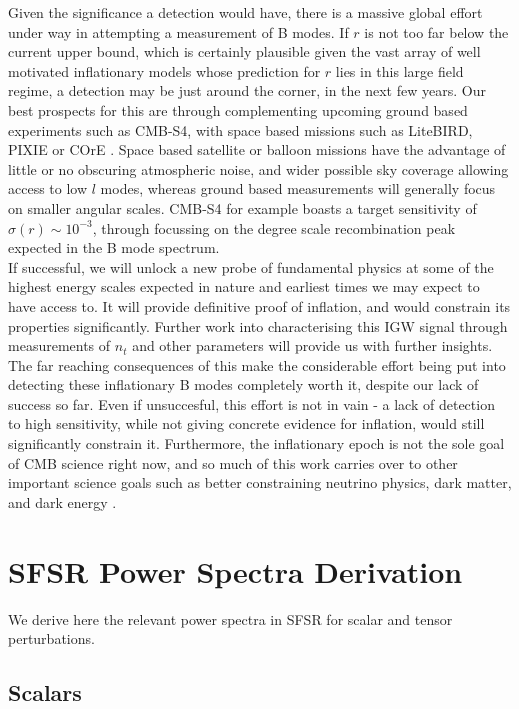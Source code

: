 \documentclass[a4paper,10pt]{article}
\begin{document}
Given the significance a detection would have, there is a massive global effort under way in attempting a measurement of B modes. If $r$ is not too far below the current upper bound, which is certainly plausible given the vast array of well motivated inflationary models whose prediction for $r$ lies in this large field regime, a detection may be just around the corner, in the next few years. Our best prospects for this are through complementing upcoming ground based experiments such as CMB-S4, with space based missions such as LiteBIRD, PIXIE or COrE \cite{S4}. Space based satellite or balloon missions have the advantage of little or no obscuring atmospheric noise, and wider possible sky coverage allowing access to low $l$ modes, whereas ground based measurements will generally focus on smaller angular scales. CMB-S4 for example boasts a target sensitivity of $\sigma(r) \sim 10^{-3}$, through focussing on the degree scale recombination peak expected in the B mode spectrum. \\

If successful, we will unlock a new probe of fundamental physics at some of the highest energy scales expected in nature and earliest times we may expect to have access to. It will provide definitive proof of inflation, and would constrain its properties significantly. Further work into characterising this IGW signal through measurements of $n_t$ and other parameters will provide us with further insights. The far reaching consequences of this make the considerable effort being put into detecting these inflationary B modes completely worth it, despite our lack of success so far. Even if unsuccesful, this effort is not in vain - a lack of detection to high sensitivity, while not giving concrete evidence for inflation, would still significantly constrain it. Furthermore, the inflationary epoch is not the sole goal of CMB science right now, and so much of this work carries over to other important science goals such as better constraining neutrino physics, dark matter, and dark energy \cite{S4}.




\appendix
\newpage

\section{SFSR Power Spectra Derivation}
\label{SFSRderivation}

We derive here the relevant power spectra in SFSR for scalar and tensor perturbations.
\subsection{Scalars}
\end{document}
